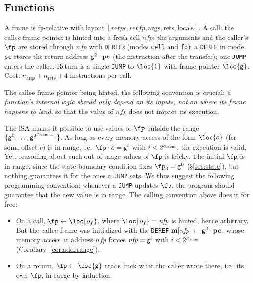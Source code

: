 \subsection{Functions}\label{sec:prog-functions}

A frame is fp-relative with layout $[\mathit{retpc},\mathit{retfp},\mathrm{args},\mathrm{rets},\mathrm{locals}]$. A call: the callee frame pointer is hinted into a fresh cell $\mathit{nfp}$; the arguments and the caller's $\fp$ are stored through $\mathit{nfp}$ with \texttt{DEREF}s (modes \texttt{cell} and \texttt{fp}); a \texttt{DEREF} in mode \texttt{pc} stores the return address $\mathsf{g}^{2}\cdot\mathbf{pc}$ (the instruction after the transfer); one \texttt{JUMP} enters the callee. Return is a single \texttt{JUMP} to $\loc{1}$ with frame pointer $\loc{\gen}$. Cost: $n_{\mathrm{args}}+n_{\mathrm{rets}}+4$ instructions per call.

The callee frame pointer being hinted, the following convention is crucial: \textit{a function's internal logic should only depend on its inputs, not on where its frame happens to land}, so that the value of $\mathit{nfp}$ does not impact its execution.

The ISA makes it possible to use values of $\fp$ outside the range $\{\mathsf{g}^{0},\dots,\mathsf{g}^{2^{\kappa_{\mathrm{mem}}}-1}\}$. As long as every memory access of the form $\loc{o}$ (for some offset $o$) is in range, i.e.\ $\fp\cdot o=\gen^{i}$ with $i<2^{\kappa_{\mathrm{mem}}}$, the execution is valid. Yet, reasoning about such out-of-range values of $\fp$ is tricky. The initial $\fp$ is in range, since the state boundary condition fixes $\fp_{0}=\gen^{0}$ (\S\ref{sec:state}), but nothing guarantees it for the ones a \texttt{JUMP} sets. We thus suggest the following programming convention: whenever a \texttt{JUMP} updates $\fp$, the program should guarantee that the new value is in range. The calling convention above does it for free:

\begin{itemize}
\item On a call, $\fp\gets\loc{o_f}$, where $\loc{o_f}=\mathit{nfp}$ is hinted, hence arbitrary. But the callee frame was initialized with the \texttt{DEREF} $\mathbf{m}[\mathit{nfp}]\gets\mathsf{g}^{2}\cdot\mathbf{pc}$, whose memory access at address $\mathit{nfp}$ forces $\mathit{nfp}=\mathsf{g}^{i}$ with $i<2^{\kappa_{\mathrm{mem}}}$ (Corollary~\ref{cor:addrrange}).
\item On a return, $\fp\gets\loc{\gen}$ reads back what the caller wrote there, i.e.\ its own $\fp$, in range by induction.
\end{itemize}

